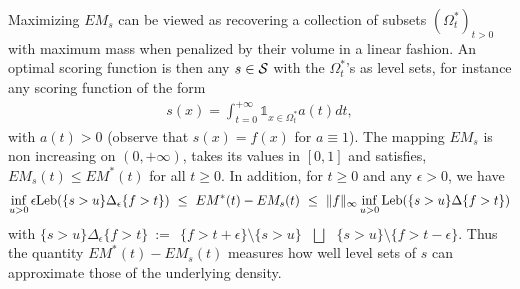 %
\begin{center}
\label{resume_fr:EMcurve}
\end{center}
%
\noindent
Maximizing $EM_s$ can be viewed as recovering a collection of subsets $(\Omega^*_t)_{t>0}$ with maximum mass when penalized by their volume in a linear fashion. An optimal scoring function is then any $s\in \S$  with the $\Omega^*_t$'s as level sets, for instance any scoring function of the form
\begin{align*}
s(x)=\int_{t=0}^{+\infty} \mathds{1}_{x\in \Omega^*_t}a(t)dt,\end{align*}
with $a(t)>0$ (observe that $s(x)=f(x)$ for $a \equiv 1$).
%
The mapping $EM_s$ is non increasing on $(0,+\infty)$, takes its values in $[0,1]$ and satisfies, $EM_s(t) \le EM^*(t)$ for all $t\geq 0$. 
In addition, for $t \ge 0$ and any $\epsilon > 0$, we have 
\begin{align*}
\inf_{u>0} \epsilon \leb (\{ s >u\}\Delta_\epsilon \{f>t\}) ~\le~ EM^*(t)-EM_s(t) ~\le~ \|f\|_\infty \inf_{u>0} \leb (\{ s >u\}\Delta\{f>t\})
\end{align*}
with $\{ s >u\}\Delta_\epsilon \{f>t\} ~:=~~ \{f>t+\epsilon\} \setminus \{ s >u\} ~~~\bigsqcup~~~ \{ s >u\} \setminus \{f>t-\epsilon\}$. Thus the quantity $EM^*(t)-EM_s(t)$ measures how well level sets of $s$ can approximate those of the underlying density.
